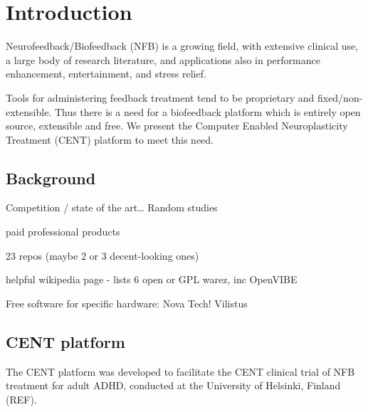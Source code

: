 \documentclass[fleqn,10pt]{wlpeerj}
\begin{document}
\newpage




\section{Introduction}

Neurofeedback/Biofeedback (NFB) is a growing field, with extensive clinical use, a large body of research literature, and applications also in performance enhancement, entertainment, and stress relief. 

Tools for administering feedback treatment tend to be proprietary and fixed/non-extensible. Thus there is a need for a biofeedback platform which is entirely open source, extensible and free. We present the Computer Enabled Neuroplasticity Treatment (CENT) platform to meet this need.




\subsection{Background}

Competition / state of the art…
Random studies

paid professional products

23 repos (maybe 2 or 3 decent-looking ones)

helpful wikipedia page - lists 6 open or GPL warez, inc OpenVIBE

Free software for specific hardware:
Nova Tech!
Vilistus


\subsection{CENT platform}

The CENT platform was developed to facilitate the CENT clinical trial of NFB treatment for adult ADHD, conducted at the University of Helsinki, Finland (REF). 
\end{document}

